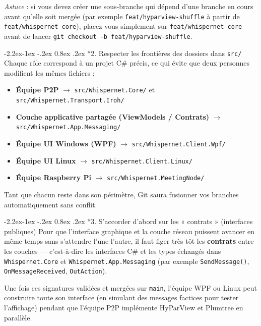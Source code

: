 \documentclass[11pt,a4paper]{article}
\makeatletter
\renewcommand\subsubsection{\@startsection{subsubsection}{3}{\z@}%
                                     {-2.2ex\@plus -1ex \@minus -.2ex}%
                                     {0.8ex \@plus .2ex}%
                                     {\normalfont\normalsize\bfseries\color{AccentTeal}}}
\makeatother
\begin{document}
\emph{Astuce} : si vous devez créer une sous-branche qui dépend d'une branche en cours avant qu'elle soit mergée (par exemple \texttt{feat/hyparview-shuffle} à partir de \texttt{feat/whispernet-core}), placez-vous simplement sur \texttt{feat/whispernet-core} avant de lancer \texttt{git checkout -b feat/hyparview-shuffle}.

\subsubsection*{2. Respecter les frontières des dossiers dans \texttt{src/}}
Chaque rôle correspond à un projet C\# précis, ce qui évite que deux personnes modifient les mêmes fichiers :
\begin{itemize}
    \item \textbf{Équipe P2P} $\rightarrow$ \texttt{src/Whispernet.Core/} et \texttt{src/Whispernet.Transport.Iroh/}
    \item \textbf{Couche applicative partagée (ViewModels / Contrats)} $\rightarrow$ \texttt{src/Whispernet.App.Messaging/}
    \item \textbf{Équipe UI Windows (WPF)} $\rightarrow$ \texttt{src/Whispernet.Client.Wpf/}
    \item \textbf{Équipe UI Linux} $\rightarrow$ \texttt{src/Whispernet.Client.Linux/}
    \item \textbf{Équipe Raspberry Pi} $\rightarrow$ \texttt{src/Whispernet.MeetingNode/}
\end{itemize}
Tant que chacun reste dans son périmètre, Git saura fusionner vos branches automatiquement sans conflit.

\subsubsection*{3. S'accorder d'abord sur les « contrats » (interfaces publiques)}
Pour que l'interface graphique et la couche réseau puissent avancer en même temps sans s'attendre l'une l'autre, il faut figer très tôt les \textbf{contrats} entre les couches — c'est-à-dire les interfaces C\# et les types échangés dans \texttt{Whispernet.Core} et \texttt{Whispernet.App.Messaging} (par exemple \texttt{SendMessage()}, \texttt{OnMessageReceived}, \texttt{OutAction}).

Une fois ces signatures validées et mergées sur \texttt{main}, l'équipe WPF ou Linux peut construire toute son interface (en simulant des messages factices pour tester l'affichage) pendant que l'équipe P2P implémente HyParView et Plumtree en parallèle.
\end{document}
